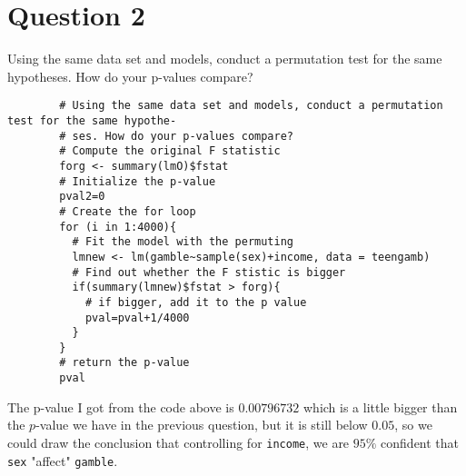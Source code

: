 \section{Question 2}

\begin{question}
    Using the same data set and models, conduct a permutation test for the same hypotheses. How do your p-values compare?
\end{question}

\begin{answer}
    \begin{verbatim}
        # Using the same data set and models, conduct a permutation test for the same hypothe-
        # ses. How do your p-values compare?
        # Compute the original F statistic
        forg <- summary(lmO)$fstat
        # Initialize the p-value
        pval2=0
        # Create the for loop
        for (i in 1:4000){
          # Fit the model with the permuting
          lmnew <- lm(gamble~sample(sex)+income, data = teengamb)
          # Find out whether the F stistic is bigger
          if(summary(lmnew)$fstat > forg){
            # if bigger, add it to the p value
            pval=pval+1/4000
          }
        }
        # return the p-value
        pval
    \end{verbatim}
    The p-value I got from the code above is $0.00796732$ which is a little bigger than the $p$-value we have in the previous question, but it is still below $0.05$, so we could draw the conclusion that controlling for \verb+income+, we are $95\%$ confident that \verb+sex+ "affect" \verb+gamble+.
\end{answer}